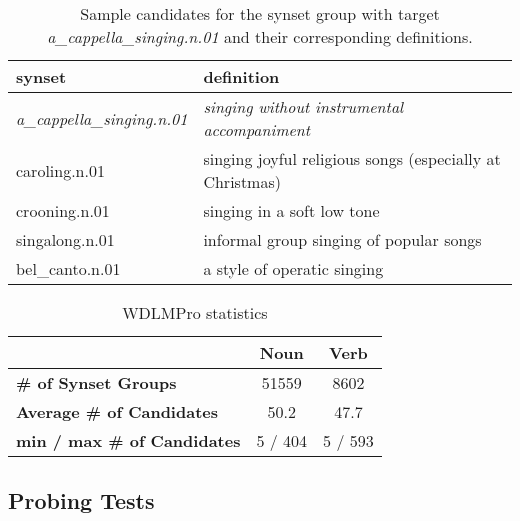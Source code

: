 \documentclass[11pt,a4paper]{article}
\begin{document}
\begin{table*}
    \centering
    \begin{tabular}{l|l}
    \hline
    \textbf{synset} & \textbf{definition} \\ \hline
    \emph{a\_cappella\_singing.n.01} & \emph{singing without instrumental accompaniment} \\
     caroling.n.01 & singing joyful religious songs (especially at Christmas) \\
     crooning.n.01 & singing in a soft low tone \\
     singalong.n.01 & informal group singing of popular songs \\
     bel\_canto.n.01 & a style of operatic singing \\ \hline
   
    \end{tabular}
    \caption{Sample candidates for the synset group with target \emph{a\_cappella\_singing.n.01} and their corresponding definitions.} 
    \label{tab:dataset_samples}
\end{table*}


\begin{table}
    \centering
    \begin{tabular}{l|cc}
    \hline
         & \textbf{Noun} & \textbf{Verb} \\ \hline
         \textbf{\# of Synset Groups} & 51559 & 8602 \\
         \textbf{Average \# of Candidates} & 50.2 & 47.7 \\
         \textbf{min / max \# of Candidates} & 5 / 404 & 5 / 593 \\ \hline
    \end{tabular}
    \caption{WDLMPro statistics}
    \label{tab:dataset_stats}
\end{table}

\subsection{Probing Tests}
\end{document}

